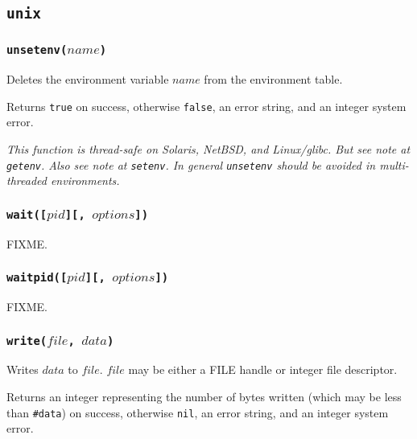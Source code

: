 \documentclass[11pt, oneside]{memoir}
\newcommand*{\true}[0]{\texttt{true}\xspace}
\newcommand*{\false}[0]{\texttt{false}\xspace}
\newcommand*{\nil}[0]{\texttt{nil}\xspace}
\newcommand*{\fn}[1]{\texttt{#1}\xspace}
\newcommand*{\otherwise}[1]{otherwise #1, an error string, and an integer system error}
\newcounter{toccols}
\newenvironment{Module}[1]{
	\subsection{\texttt{#1}}
	\addtocontents{toc}{
		\protect\begin{multicols}{\value{toccols}}
	}
}{
	\addtocontents{toc}{\protect\end{multicols}}
}
\begin{document}
\begin{Module}{unix}
\subsubsection[\fn{unsetenv}]{\fn{unsetenv($name$)}}

Deletes the environment variable $name$ from the environment table.

Returns \true on success, otherwise \false, an error string, and an integer system error.

\emph{This function is thread-safe on Solaris, NetBSD, and Linux/glibc. But see note at \fn{getenv}. Also see note at \fn{setenv}. In general \fn{unsetenv} should be avoided in multi-threaded environments.}

\subsubsection[\fn{wait}]{\fn{wait([$pid$][, $options$])}}

FIXME.

\subsubsection[\fn{waitpid}]{\fn{waitpid([$pid$][, $options$])}}

FIXME.

\subsubsection[\fn{write}]{\fn{write($file$, $data$)}}

Writes $data$ to $file$. $file$ may be either a FILE handle or integer file descriptor.

Returns an integer representing the number of bytes written (which may be less than \texttt{\#data}) on success, \otherwise{\nil}.

\end{Module}
\end{document}
